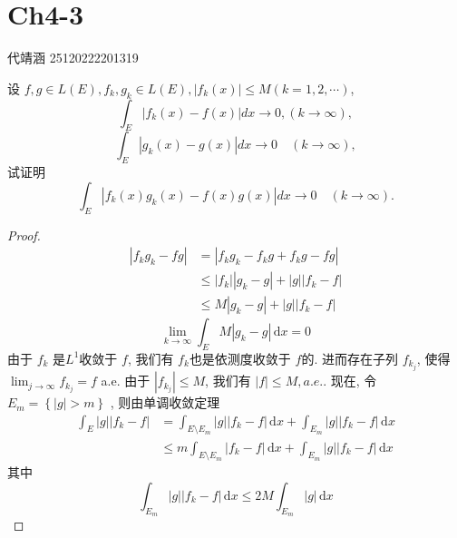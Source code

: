 \documentclass[../main.tex]{subfiles}
\begin{document}
\ifSubfilesClassLoaded{

    
    \setcounter{chapter}{3}
}{}

\chapter{ Ch4-3 }
 代靖涵 25120222201319
\begin{exercise}{}{}
设 $f, g \in L(E), f_k, g_k \in L(E), |f_k(x)| \le M (k=1,2,\cdots)$,
\[
\int_E |f_k(x) - f(x)| dx \to 0, (k \to \infty),
\]
\[
\int_E |g_k(x) - g(x)| dx \to 0 \quad (k \to \infty),
\]
试证明
\[
\int_E |f_k(x)g_k(x) - f(x)g(x)| dx \to 0 \quad (k \to \infty).
\]
\end{exercise}
\begin{proof}
    \begin{equation}
        \begin{aligned}
            \left| f_{k}g_{k}-fg \right|&=  \left| f_{k}g_{k}-f_{k}g+  f_{k}g-fg\right|\\ 
             &\le \left| f_{k} \right|\left| g_{k}-g \right|+ \left| g \right|\left| f_{k}-f \right|\\ 
              &\le M\left| g_{k}-g \right|+ \left| g \right|\left| f_{k}-f \right|         
        \end{aligned}
    \end{equation}
\[
\lim_{k\to \infty}\int _{E}M\left| g_{k}-g \right|\,\mathrm{d} x= 0 
\]
由于 \(  f_{k}  \) 是\(  L^{1}  \)收敛于 \(  f  \), 我们有  \(  f_{k}  \)也是依测度收敛于 \(  f  \)的. 进而存在子列 \(  f_{k_{j}}  \), 使得 \(  \lim_{j\to \infty}f_{k_{j}}= f   \) a.e. 由于 \(  \left| f_{k_{j}} \right|\le M   \), 我们有 \(  \left| f \right|\le M,  a.e.   \).  现在, 令 \(  E_{m}= \left\{ \left| g \right|  > m\right\}  \)      , 则由单调收敛定理 \begin{equation}
    \begin{aligned}
        \int _{E} \left| g \right|\left| f_{k}-f \right|&  = \int_{E\setminus E_{m}}\left| g \right|\left| f_{k}-f \right|\,\mathrm{d} x+  \int_{E_{m}}\left| g \right|\left| f_{k}-f \right|\,\mathrm{d} x  \\ 
         &\le m \int_{E\setminus E_{m}}\left| f_{k}-f \right|\,\mathrm{d} x+ \int_{E_{m}}\left| g \right|\left| f_{k}-f \right|\,\mathrm{d} x     
    \end{aligned}
\end{equation}
其中 \[
\int_{E_{m}}\left| g \right|\left| f_{k}-f \right|\,\mathrm{d} x\le 2M\int_{E_{m}}\left| g \right|\,\mathrm{d} x
\]
\end{proof}
\end{document}

